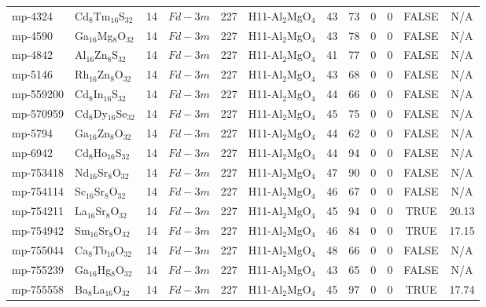 {\begin{longtable}{llcccccccccc}
    mp-4324 & Cd$_{8}$Tm$_{16}$S$_{32}$ & 14    & $Fd-3m$ & 227   & H11-Al$_{2}$MgO$_{4}$ & 43    & 73    & 0     & 0     & FALSE & N/A \\
    mp-4590 & Ga$_{16}$Mg$_{8}$O$_{32}$ & 14    & $Fd-3m$ & 227   & H11-Al$_{2}$MgO$_{4}$ & 43    & 78    & 0     & 0     & FALSE & N/A \\
    mp-4842 & Al$_{16}$Zn$_{8}$S$_{32}$ & 14    & $Fd-3m$ & 227   & H11-Al$_{2}$MgO$_{4}$ & 41    & 77    & 0     & 0     & FALSE & N/A \\
    mp-5146 & Rh$_{16}$Zn$_{8}$O$_{32}$ & 14    & $Fd-3m$ & 227   & H11-Al$_{2}$MgO$_{4}$ & 43    & 68    & 0     & 0     & FALSE & N/A \\
    mp-559200 & Cd$_{8}$In$_{16}$S$_{32}$ & 14    & $Fd-3m$ & 227   & H11-Al$_{2}$MgO$_{4}$ & 44    & 66    & 0     & 0     & FALSE & N/A \\
    mp-570959 & Cd$_{8}$Dy$_{16}$Se$_{32}$ & 14    & $Fd-3m$ & 227   & H11-Al$_{2}$MgO$_{4}$ & 45    & 75    & 0     & 0     & FALSE & N/A \\
    mp-5794 & Ga$_{16}$Zn$_{8}$O$_{32}$ & 14    & $Fd-3m$ & 227   & H11-Al$_{2}$MgO$_{4}$ & 44    & 62    & 0     & 0     & FALSE & N/A \\
    mp-6942 & Cd$_{8}$Ho$_{16}$S$_{32}$ & 14    & $Fd-3m$ & 227   & H11-Al$_{2}$MgO$_{4}$ & 44    & 94    & 0     & 0     & FALSE & N/A \\
    mp-753418 & Nd$_{16}$Sr$_{8}$O$_{32}$ & 14    & $Fd-3m$ & 227   & H11-Al$_{2}$MgO$_{4}$ & 47    & 90    & 0     & 0     & FALSE & N/A \\
    mp-754114 & Sc$_{16}$Sr$_{8}$O$_{32}$ & 14    & $Fd-3m$ & 227   & H11-Al$_{2}$MgO$_{4}$ & 46    & 67    & 0     & 0     & FALSE & N/A \\
    mp-754211 & La$_{16}$Sr$_{8}$O$_{32}$ & 14    & $Fd-3m$ & 227   & H11-Al$_{2}$MgO$_{4}$ & 45    & 94    & 0     & 0     & TRUE  & 20.13  \\
    mp-754942 & Sm$_{16}$Sr$_{8}$O$_{32}$ & 14    & $Fd-3m$ & 227   & H11-Al$_{2}$MgO$_{4}$ & 46    & 84    & 0     & 0     & TRUE  & 17.15  \\
    mp-755044 & Ca$_{8}$Tb$_{16}$O$_{32}$ & 14    & $Fd-3m$ & 227   & H11-Al$_{2}$MgO$_{4}$ & 48    & 66    & 0     & 0     & FALSE & N/A \\
    mp-755239 & Ga$_{16}$Hg$_{8}$O$_{32}$ & 14    & $Fd-3m$ & 227   & H11-Al$_{2}$MgO$_{4}$ & 43    & 65    & 0     & 0     & FALSE & N/A \\
    mp-755558 & Ba$_{8}$La$_{16}$O$_{32}$ & 14    & $Fd-3m$ & 227   & H11-Al$_{2}$MgO$_{4}$ & 45    & 97    & 0     & 0     & TRUE  & 17.74  \\

\end{longtable}}
